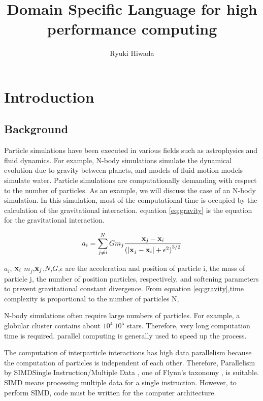 \documentclass[ams, a4j]{U-AizuGT}
\author{Ryuki Hiwada}
\title{Domain Specific Language for high performance computing}
\begin{document}
\maketitle
\begin{abstract}

\end{abstract}
\section{Introduction}


\subsection{Background}

Particle simulations have been executed in various fields such as 
astrophysics and fluid dynamics. For example, N-body simulations 
simulate the dynamical evolution due to gravity between planets,
and models of fluid motion models simulate water.
Particle simulations are computationally demanding
with respect to the number of particles.
As an example, we will discuss the case of an N-body simulation.
In this simulation, most of the computational time is occupied by
the calculation of the gravitational interaction. equation \eqref{eq:gravity} is 
the equation for the gravitational interaction.

\begin{equation}
a_i = \sum_{\substack{j \neq i}}^{N} G m_j \frac{\vb{x}_j - \vb{x}_i}{\left( \left| \vb{x}_j - \vb{x}_i \right| + \epsilon^2 \right)^{3/2}\label{eq:gravity}}
\end{equation}

$a_i$, $\vb{x}_i$ $m_j$,$\vb{x}_j$,$N$,$G$,$\epsilon$
are the acceleration and position of particle i, the mass of particle j, the number of position particles, respectively, and
softening parameters to prevent gravitational constant divergence.
From equation \eqref{eq:gravity},time complexity is proportional to 
the number of particles N, 

 N-body simulations often require large numbers of particles.
For example, a globular cluster contains about $10^4 ~ 10^5 $ stars.
Therefore, very long computation time is required.  parallel computing is 
generally used to speed up the process.


The computation of interparticle interactions has high
data parallelism because the computation of particles is 
independent of each other. Therefore, 
Parallelism by SIMD\lparen Single Instruction/Multiple Data \rparen, 
one of Flynn's taxonomy \cite{flynn1972some} , is suitable.
SIMD means processing multiple data for a single instruction.
However, to perform SIMD, code must be written for the computer architecture.
\end{document}
